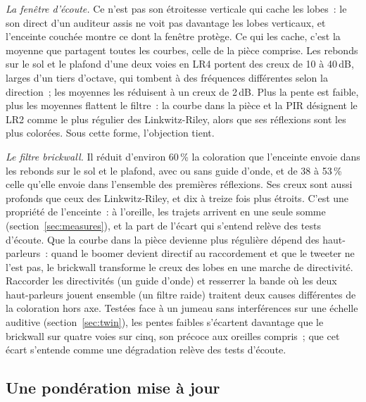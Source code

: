\documentclass[11pt,a4paper]{article}
\begin{document}
\emph{La fenêtre d'écoute.} Ce n'est pas son étroitesse verticale qui cache les lobes~: le son direct d'un
auditeur assis ne voit pas davantage les lobes verticaux, et l'enceinte couchée montre ce dont la
fenêtre protège. Ce qui les cache, c'est la moyenne que partagent toutes les courbes, celle de la pièce
comprise. Les rebonds sur le sol et le plafond d'une deux voies en LR4 portent des creux de 10 à 40\,dB,
larges d'un tiers d'octave, qui tombent à des fréquences différentes selon la direction~; les moyennes
les réduisent à un creux de 2\,dB. Plus la pente est faible, plus les moyennes flattent le filtre~: la
courbe dans la pièce et la PIR désignent le LR2 comme le plus régulier des Linkwitz-Riley, alors que ses
réflexions sont les plus colorées. Sous cette forme, l'objection tient.

\emph{Le filtre brickwall.} Il réduit d'environ 60\,\% la coloration que l'enceinte envoie dans les
rebonds sur le sol et le plafond, avec ou sans guide d'onde, et de 38 à 53\,\% celle qu'elle envoie dans
l'ensemble des premières réflexions. Ses creux sont aussi profonds que ceux des Linkwitz-Riley, et dix à
treize fois plus étroits. C'est une propriété de l'enceinte~: à l'oreille, les trajets arrivent en une
seule somme (section~\ref{sec:measures}), et la part de l'écart qui s'entend relève des tests d'écoute. Que la courbe
dans la pièce devienne plus régulière dépend des haut-parleurs~: quand le boomer devient directif au
raccordement et que le tweeter ne l'est pas, le brickwall transforme le creux des lobes en une marche de
directivité. Raccorder les directivités (un guide d'onde) et resserrer la bande où les deux
haut-parleurs jouent ensemble (un filtre raide) traitent deux causes différentes de la coloration hors
axe. Testées face à un jumeau sans interférences sur une échelle auditive (section~\ref{sec:twin}), les
pentes faibles s'écartent davantage que le brickwall sur quatre voies sur cinq, son précoce aux oreilles
compris~; que cet écart s'entende comme une dégradation relève des tests d'écoute.

\subsection{Une pondération mise à jour}
\end{document}
